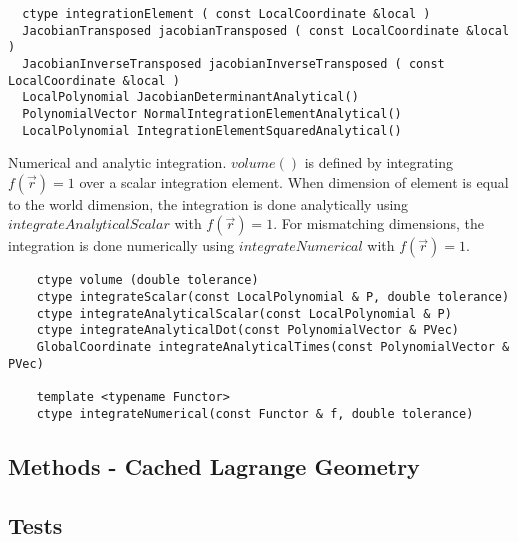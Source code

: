 \begin{mybox}
\begin{lstlisting}
  ctype integrationElement ( const LocalCoordinate &local )
  JacobianTransposed jacobianTransposed ( const LocalCoordinate &local )
  JacobianInverseTransposed jacobianInverseTransposed ( const LocalCoordinate &local )
  LocalPolynomial JacobianDeterminantAnalytical()
  PolynomialVector NormalIntegrationElementAnalytical()
  LocalPolynomial IntegrationElementSquaredAnalytical()
\end{lstlisting}
\end{mybox}


Numerical and analytic integration. $volume()$ is defined by integrating $f(\vec{r}) = 1$ over a scalar integration element. When dimension of element is equal to the world dimension, the integration is done analytically using $integrateAnalyticalScalar$ with $f(\vec{r}) = 1$. For mismatching dimensions, the integration is done numerically using $integrateNumerical$ with $f(\vec{r}) = 1$.  \\
\begin{mybox}
\begin{lstlisting}
    ctype volume (double tolerance)
    ctype integrateScalar(const LocalPolynomial & P, double tolerance)
    ctype integrateAnalyticalScalar(const LocalPolynomial & P)
    ctype integrateAnalyticalDot(const PolynomialVector & PVec)
    GlobalCoordinate integrateAnalyticalTimes(const PolynomialVector & PVec)

    template <typename Functor>
    ctype integrateNumerical(const Functor & f, double tolerance)
\end{lstlisting}
\end{mybox}



\subsection{Methods - Cached Lagrange Geometry}
\label{interface-curvilineargeometry-cached-methods}



\subsection{Tests}

